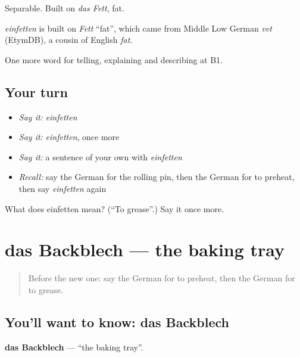 Separable. Built on \emph{das Fett}, fat.

\begin{cousinweb}
\emph{einfetten} is built on \emph{Fett} \textquotedblleft{}fat\textquotedblright{}, which came from Middle Low German \emph{vet} (EtymDB), a cousin of English \emph{fat}.
\end{cousinweb}

\begin{grammarlens}[title={What you've built}]
One more word for telling, explaining and describing at B1.
\end{grammarlens}

\subsection*{Your turn}
\begin{itemize}
\raggedright
  \item \emph{Say it:} \emph{einfetten}
  \item \emph{Say it:} \emph{einfetten}, once more
  \item \emph{Say it:} a sentence of your own with \emph{einfetten}
  \item \emph{Recall:} say the German for the rolling pin, then the German for to preheat, then say \emph{einfetten} again
\end{itemize}

\begin{tcolorbox}[breakable,colback=teal!4,colframe=teal!35!black,title={Before you move on}]
What does einfetten mean? (\textquotedblleft{}To grease\textquotedblright{}.) Say it once more.
\end{tcolorbox}
\section[das Backblech]{das Backblech — the baking tray}

\label{lesson:GE-C326-backblech}



\begin{quote}
Before the new one: say the German for to preheat, then the German for to grease.
\end{quote}

\subsection*{You'll want to know: das Backblech}
\textbf{das Backblech} — \textquotedblleft{}the baking tray\textquotedblright{}.

